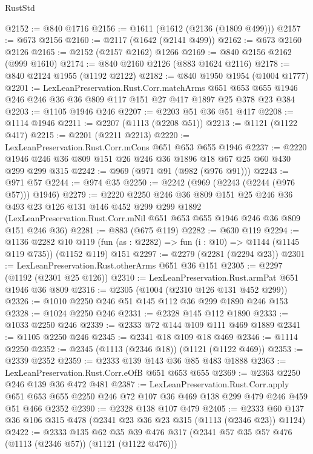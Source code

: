 \begin{lexlean}{RustStd}
\begin{coremodule}
{\begin{coremodule}
{{{{{{{{{{@2152 := @840 @1716
@2156 := @1611 (@1612 (@2136 (@1809 @499)))
@2157 := @673 @2156
@2160 := @2117 (@1642 (@2141 @499))
@2162 := @673 @2160 @2126
@2165 := @2152 (@2157 @2162) @1266
@2169 := @840 @2156 @2162 (@999 @1610)
@2174 := @840 @2160 @2126 (@883 @1624 @2116)
@2178 := @840 @2124 @1955 (@1192 @2122)
@2182 := @840 @1950 @1954 (@1004 @1777)
@2201 := LexLeanPreservation.Rust.Corr.matchArms
    @651
    @653
    @655
    @1946
    @246
    @246
    @36
    @36
    @809
    @117
    @151
    @27
    @417
    @1897
    @25
    @378
    @23
    @384
@2203 := @1105 @1946 @246
@2207 := @2203 @51 @36 @51 @417
@2208 := @1114 @1946
@2211 := @2207 (@1113 (@2208 @51))
@2213 := @1121 (@1122 @417)
@2215 := @2201 (@2211 @2213)
@2220 := LexLeanPreservation.Rust.Corr.mCons @651 @653 @655 @1946
@2237 := @2220 @1946 @246 @36 @809 @151 @26 @246 @36 @1896 @18 @67 @25 @60 @430 @299 @299 @315
@2242 := @969 (@971 @91 (@982 (@976 @91)))
@2243 := @971 @57
@2244 := @974 @35
@2250 := @2242 (@969 (@2243 (@2244 (@976 @57))) @1946)
@2279 := @2220
    @2250
    @246
    @36
    @809
    @151
    @25
    @246
    @36
    @493
    @23
    @126
    @131
    @146
    @452
    @299
    @299
    @1892
    (LexLeanPreservation.Rust.Corr.mNil @651 @653 @655 @1946 @246 @36 @809 @151 @246 @36)
@2281 := @883 (@675 @119)
@2282 := @630 @119
@2294 := @1136
    @2282
    @10
    @119
    (fun (as : @2282) => fun (i : @10) => @1144 (@1145 @119 @735))
    (@1152 @119)
    @151
@2297 := @2279 (@2281 (@2294 @23))
@2301 := LexLeanPreservation.Rust.otherArms @651 @36 @151
@2305 := @2297 (@1192 (@2301 @25 @126))
@2310 := LexLeanPreservation.Rust.armPat @651 @1946 @36 @809
@2316 := @2305 (@1004 (@2310 @126 @131 @452 @299))
@2326 := @1010 @2250 @246 @51 @145 @112 @36 @299 @1890 @246 @153
@2328 := @1024 @2250 @246
@2331 := @2328 @145 @112 @1890
@2333 := @1033 @2250 @246
@2339 := @2333 @72 @144 @109 @111 @469 @1889
@2341 := @1105 @2250 @246
@2345 := @2341 @18 @109 @18 @469
@2346 := @1114 @2250
@2352 := @2345 (@1113 (@2346 @18)) (@1121 (@1122 @469))
@2353 := @2339 @2352
@2359 := @2333 @139 @143 @36 @85 @483 @1888
@2363 := LexLeanPreservation.Rust.Corr.eOfB @651 @653 @655
@2369 := @2363 @2250 @246 @139 @36 @472 @481
@2387 := LexLeanPreservation.Rust.Corr.apply
    @651
    @653
    @655
    @2250
    @246
    @72
    @107
    @36
    @469
    @138
    @299
    @479
    @246
    @459
    @51
    @466
    @2352
@2390 := @2328 @138 @107 @479
@2405 := @2333 @60 @137 @36 @106 @315 @478 (@2341 @23 @36 @23 @315 (@1113 (@2346 @23)) @1124)
@2422 := @2333
    @135
    @62
    @35
    @39
    @476
    @317
    (@2341 @57 @35 @57 @476 (@1113 (@2346 @57)) (@1121 (@1122 @476)))
}}}}}}}}}}
\end{coremodule}}
\end{coremodule}
\end{lexlean}
